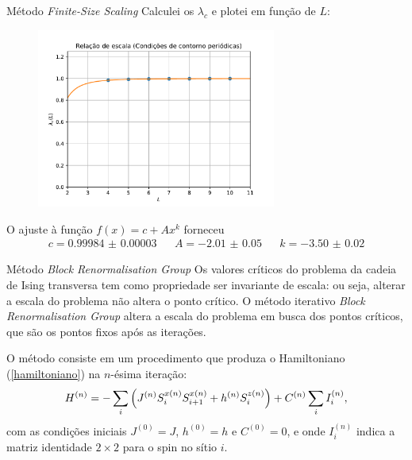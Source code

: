 \documentclass[brazil]{beamer}
\begin{document}
\begin{frame}{Método \textit{Finite-Size Scaling}}
    Calculei os \( \lambda_c \) e plotei em função de \( L \):
    \begin{figure}
        \centering
        \includegraphics[width=0.7\textwidth]{rel_escala_ccp.pdf}
    \end{figure}
    O ajuste à função \( f(x) = c + A x^k \) forneceu
    \begin{align*}
        c = \num{0.99984(3)} &  & A = \num{-2.01(5)} &  & k = \num{-3.50(2)}
    \end{align*}
\end{frame}

\begin{frame}{Método \textit{Block Renormalisation Group}}
    Os valores críticos do problema da cadeia de Ising transversa tem como propriedade ser invariante de escala: ou seja, alterar a escala do problema não altera o ponto crítico. O método iterativo \textit{Block Renormalisation Group} altera a escala do problema em busca dos pontos críticos, que são os pontos fixos após as iterações.

    O método consiste em um procedimento que produza o Hamiltoniano (\ref{hamiltoniano}) na \( n \)-ésima iteração:
    \begin{equation}
        H^{(n)} = - \sum_i \qty( J^{(n)} S_i^{x (n)} S_{i + 1}^{x (n)} + h^{(n)} S_i^{z (n)} ) + C^{(n)} \sum_i I_i^{(n)} , \label{H_n}
    \end{equation}
    com as condições iniciais \( J^{(0)} = J \), \( h^{(0)} = h \) e \( C^{(0)} = 0 \), e onde \( I_i^{(n)} \) indica a matriz identidade \( 2 \times 2 \) para o spin no sítio \( i \).
\end{frame}
\end{document}
